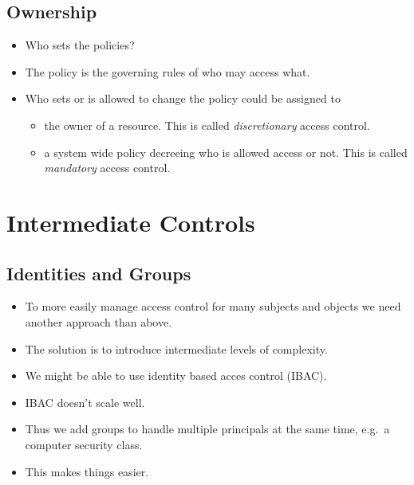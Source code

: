 \documentclass{beamer}
\begin{document}
\subsection{Ownership}

\begin{frame}{\insertsubsectionhead}
  \begin{itemize}
    \item Who sets the policies?

    \item The policy is the governing rules of who may access what.

    \item Who sets or is allowed to change the policy could be assigned to
      \begin{itemize}
        \item the owner of a resource.
          This is called \emph{discretionary} access control.

        \item a system wide policy decreeing who is allowed access or not.
          This is called \emph{mandatory} access control.

      \end{itemize}
  \end{itemize}
\end{frame}


\section{Intermediate Controls}

\subsection{Identities and Groups}

\begin{frame}{\insertsubsectionhead}
  \begin{itemize}
    \item To more easily manage access control for many subjects and objects we 
      need another approach than above.

    \item The solution is to introduce intermediate levels of complexity.

  \end{itemize}
\end{frame}

\begin{frame}{\insertsubsectionhead}
  \begin{itemize}
    \item We might be able to use identity based acces control (IBAC).
    \item IBAC doesn't scale well.

    \item Thus we add groups to handle multiple principals at the same time, 
      e.g.\ a computer security class.

    \item This makes things easier.

  \end{itemize}
\end{frame}
\end{document}
